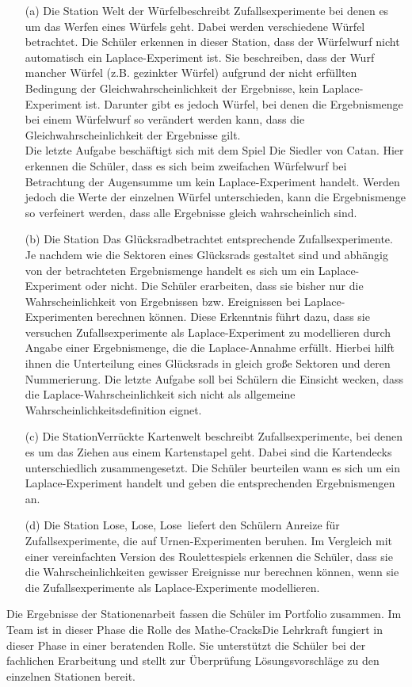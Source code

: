 \documentclass[a4paper,12pt,twoside=false]{scrartcl}
\begin{document}
\begin{itemize}
	\item[(a)] Die Station \glqq Welt der Würfel\grqq beschreibt Zufallsexperimente bei denen es um das Werfen eines Würfels geht. Dabei werden verschiedene Würfel betrachtet. Die Schüler erkennen in dieser Station, dass der Würfelwurf nicht automatisch ein Laplace-Experiment ist. Sie beschreiben, dass der Wurf mancher Würfel (z.B. gezinkter Würfel) aufgrund der nicht erfüllten Bedingung der Gleichwahrscheinlichkeit der Ergebnisse, kein Laplace-Experiment ist. Darunter gibt es jedoch Würfel, bei denen die Ergebnismenge bei einem Würfelwurf so verändert werden kann, dass die Gleichwahrscheinlichkeit der Ergebnisse gilt. \\
	Die letzte Aufgabe beschäftigt sich mit dem Spiel \glqq Die Siedler von Catan\grqq. Hier erkennen die Schüler, dass es sich beim zweifachen Würfelwurf bei Betrachtung der Augensumme um kein Laplace-Experiment handelt. Werden jedoch die Werte der einzelnen Würfel unterschieden, kann die Ergebnismenge so verfeinert werden, dass alle Ergebnisse gleich wahrscheinlich sind.  
	\item[(b)] Die Station \glqq Das Glücksrad\grqq betrachtet entsprechende Zufallsexperimente. Je nachdem wie die Sektoren eines Glücksrads gestaltet sind und abhängig von der betrachteten Ergebnismenge handelt es sich um ein Laplace-Experiment oder nicht. Die Schüler erarbeiten, dass sie bisher nur die Wahrscheinlichkeit von Ergebnissen bzw. Ereignissen bei Laplace-Experimenten berechnen können. Diese Erkenntnis führt dazu, dass sie versuchen Zufallsexperimente als Laplace-Experiment zu modellieren durch Angabe einer Ergebnismenge, die die Laplace-Annahme erfüllt. Hierbei hilft ihnen die Unterteilung eines Glücksrads in gleich große Sektoren und deren Nummerierung. Die letzte Aufgabe soll bei Schülern die Einsicht wecken, dass die Laplace-Wahrscheinlichkeit sich nicht als allgemeine Wahrscheinlichkeitsdefinition eignet. 
	\item[(c)] Die Station\glqq Verrückte Kartenwelt \grqq beschreibt Zufallsexperimente, bei denen es um das Ziehen aus einem Kartenstapel geht. Dabei sind die Kartendecks unterschiedlich zusammengesetzt. Die Schüler beurteilen wann es sich um ein Laplace-Experiment handelt und geben die entsprechenden Ergebnismengen an. 
	\item[(d)] Die Station \glqq Lose, Lose, Lose\grqq$~$ liefert den Schülern Anreize für Zufallsexperimente, die auf Urnen-Experimenten beruhen. Im Vergleich mit einer vereinfachten Version des Roulettespiels erkennen die Schüler, dass sie die Wahrscheinlichkeiten gewisser Ereignisse nur berechnen können, wenn sie die Zufallsexperimente als Laplace-Experimente modellieren.  
\end{itemize}
Die Ergebnisse der Stationenarbeit fassen die Schüler im Portfolio zusammen. Im Team ist in dieser Phase die Rolle des \glqq Mathe-Cracks\grqq Die Lehrkraft fungiert in dieser Phase in einer beratenden Rolle. Sie unterstützt die Schüler bei der fachlichen Erarbeitung und stellt zur Überprüfung Lösungsvorschläge zu den einzelnen Stationen bereit.
\end{document}
